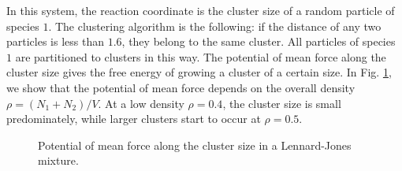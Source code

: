 \documentclass[aip,jcp,preprint,superscriptaddress]{revtex4-1}
\begin{document}
In this system,
the reaction coordinate is the cluster size
of a random particle of species $1$.
%
The clustering algorithm is the following:
if the distance of any two particles is less than $1.6$,
they belong to the same cluster.
%
All particles of species $1$
are partitioned to clusters in this way.
%
The potential of mean force along the cluster size
gives the free energy of growing a cluster of a certain size.
%
In Fig. \ref{fig:ljmix1},
we show that the potential of mean force
depends on the overall density $\rho = (N_1 + N_2)/V$.
%
At a low density $\rho = 0.4$,
the cluster size is small predominately,
while larger clusters start to occur at $\rho = 0.5$.


\begin{figure}[h]
  \caption{
    \label{fig:ljmix1}
    Potential of mean force along the cluster size
    in a Lennard-Jones mixture.
  }
\end{figure}
\end{document}
